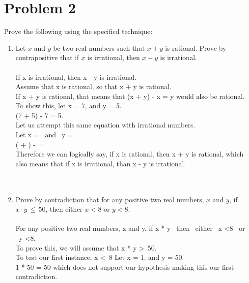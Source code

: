   \section*{Problem 2}
  Prove the following using the specified technique:
  \begin{enumerate}[label=(\alph*)]
    \item Let $x$ and $y$ be two real numbers such that $x + y$ is rational. Prove by contrapositive that if $x$ is irrational, then $x - y$ is irrational.
          \\\\
  If x is irrational, then x - y is irrational. \\
  Assume that x is rational, so that x + y is rational. \\
  If x + y is rational, that means that (x + y) - x = y would also be rational. \\
  To show this, let x = 7, and y = 5. \\
  (7 + 5) - 7 = 5. \\
  Let us attempt this same equation with irrational numbers. \\
  Let x =  \ and \ y =  \\
  ( + ) -  =  \\
  
  Therefore we can logically say, if x is rational, then x + y is rational, which also means that if x is irrational, than x - y is irrational.
  \\
\\\\
    \item Prove by contradiction that for any positive two real numbers, $x$ and $y$,
         if $x\cdot y\, \leq \,50$, then either $x < 8$ or $y < 8$.
          \\\\
  For any positive two real numbers, x and y, if x * y  \ then \ either \ x \textless 8 \ or \ y \textless 8. \\
  
  To prove this, we will assume that x * y \textgreater \ 50. \\
  
  To test our first instance, x \textless \ 8 Let x = 1, and y = 50. \\
  
  1 * 50 = 50 which does not support our hypothesis making this our first contradiction. \\
  

\end{enumerate}
